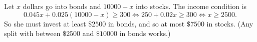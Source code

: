 Let $x$ dollars go into bonds and $10000-x$ into stocks. The income condition is
\[
0.045x+0.025(10000-x)\ge300\iff 250+0.02x\ge300\iff x\ge2500 .
\]
So she must invest at least $\boxed{\$2500}$ in bonds, and so at most $\$7500$ in stocks. (Any split with between $\$2500$ and $\$10000$ in bonds works.)
